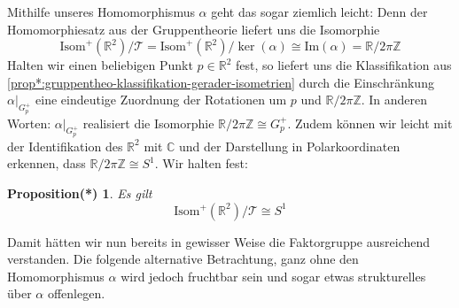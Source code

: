 \documentclass[a4paper, ngerman]{article}
\newcounter{chapter}
\numberwithin{equation}{chapter}
\theoremstyle{plain}
\newtheorem{propositionstrd}{Proposition(*)}[chapter]
\theoremstyle{definition}
\newcommand{\geradisometr}{\ensuremath{\mathrm{Isom}^+(\mathbb R^2)}}
\begin{document}
Mithilfe unseres Homomorphismus \(\alpha\) geht das sogar ziemlich leicht: Denn der Homomorphiesatz aus der Gruppentheorie liefert uns die Isomorphie 
\begin{equation*}
    \geradisometr/\mathcal T = \geradisometr/\ker(\alpha) \cong \mathrm{Im}(\alpha) = \mathbb R/2\pi\mathbb Z
\end{equation*}
Halten wir einen beliebigen Punkt \(p\in \mathbb R^2\) fest, so liefert uns die Klassifikation aus \cref{prop*:gruppentheo-klassifikation-gerader-isometrien} durch die Einschränkung \(\alpha|_{G_p^+}\) eine eindeutige Zuordnung der Rotationen um \(p\) und \(\mathbb R/2\pi\mathbb Z\). In anderen Worten: \(\alpha|_{G_p^+}\) realisiert die Isomorphie \(\mathbb R/2\pi\mathbb Z \cong G_p^+\). Zudem können wir leicht mit der Identifikation des \(\mathbb R^2\) mit \(\mathbb C\) und der Darstellung in Polarkoordinaten erkennen, dass \(\mathbb R/2\pi\mathbb Z\cong S^1\). Wir halten fest: 
\begin{propositionstrd}\label{prop*:gestalt-quotient-über-translationen}
    Es gilt 
    \begin{equation*}
        \mathrm{Isom^+(\mathbb R^2)}/\mathcal T \cong S^1 
    \end{equation*}
\end{propositionstrd}
\noindent Damit hätten wir nun bereits in gewisser Weise die Faktorgruppe ausreichend verstanden. Die folgende alternative Betrachtung, ganz ohne den Homomorphismus \(\alpha\) wird jedoch fruchtbar sein und sogar etwas strukturelles über \(\alpha\) offenlegen. 
\end{document}
